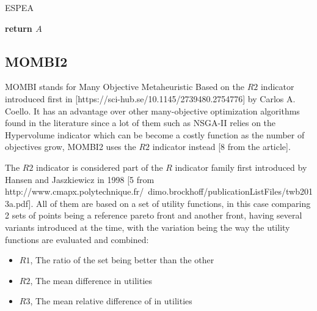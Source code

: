 \begin{algorithm}[H]
\label{espea_alg}
\caption{ESPEA}
\SetAlgoLined
{}
\textbf{return $A$}
\end{algorithm}


\subsection{MOMBI2}

MOMBI stands for Many Objective Metaheuristic Based on the $R2$ indicator introduced first in [https://sci-hub.se/10.1145/2739480.2754776] by Carlos A. Coello. It has an advantage over other  many-objective optimization algorithms found in the literature since a lot of them such as NSGA-II relies on the Hypervolume indicator which can be become a costly function as the number of objectives grow, MOMBI2 uses the $R2$ indicator instead [8 from the article]. 

The $R2$ indicator is considered part of the $R$ indicator family first introduced by Hansen and Jaszkiewicz in 1998 [5 from http://www.cmapx.polytechnique.fr/~dimo.brockhoff/publicationListFiles/twb2013a.pdf]. All of them are based on a set of utility functions, in this case comparing 2 sets of points being a reference pareto front and another front,  having several variants introduced at the time, with the variation being the way the utility functions are evaluated and combined:
\begin{itemize}
    \item $R1$, The ratio of the set being better than the other
    \item $R2$, The mean difference in utilities
    \item $R3$, The mean relative difference of in utilities
\end{itemize}

